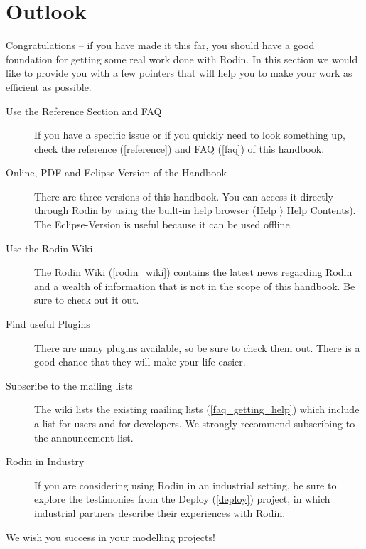 \section{Outlook}
\label{tut_outlook}

Congratulations -- if you have made it this far, you should have a good foundation for getting some real work done with Rodin.  In this section we would like to provide you with a few pointers that will help you to make your work as efficient as possible.

\begin{description}
	\item[Use the Reference Section and FAQ] If you have a specific issue or if you quickly need to look something up, check the reference (\ref{reference}) and FAQ (\ref{faq}) of this handbook.
	\item[Online, PDF and Eclipse-Version of the Handbook] There are three versions of this handbook.  You can access it directly through Rodin by using the built-in help browser (\textsf{Help $\rangle$ Help Contents}).  The Eclipse-Version is useful because it can be used offline.
	\item[Use the Rodin Wiki] The Rodin Wiki (\ref{rodin_wiki}) contains the latest news regarding Rodin and a wealth of information that is not in the scope of this handbook.  Be sure to check out it out.
	\item[Find useful Plugins] There are many plugins available, so be sure to check them out.  There is a good chance that they will make your life easier.
	\item[Subscribe to the mailing lists] The wiki lists the existing mailing lists (\ref{faq_getting_help}) which include a list for users and for developers.  We strongly recommend subscribing to the announcement list.
	\item[Rodin in Industry] If you are considering using Rodin in an industrial setting, be sure to explore the testimonies from the Deploy (\ref{deploy}) project, in which industrial partners describe their experiences with Rodin.
\end{description}

We wish you success in your modelling projects!

